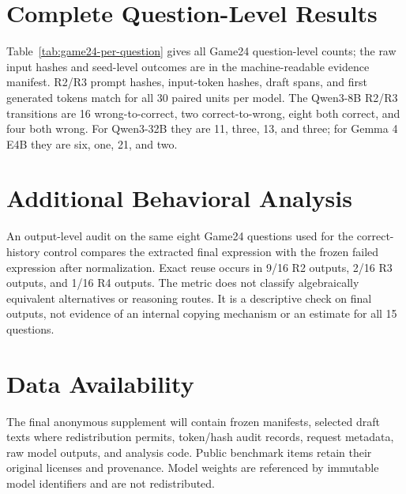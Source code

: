 \documentclass{article}
\begin{document}
\section{Complete Question-Level Results}

Table~\ref{tab:game24-per-question} gives all Game24 question-level counts; the raw input hashes and seed-level outcomes are in the machine-readable evidence manifest. R2/R3 prompt hashes, input-token hashes, draft spans, and first generated tokens match for all 30 paired units per model. The Qwen3-8B R2/R3 transitions are 16 wrong-to-correct, two correct-to-wrong, eight both correct, and four both wrong. For Qwen3-32B they are 11, three, 13, and three; for Gemma 4 E4B they are six, one, 21, and two.



\section{Additional Behavioral Analysis}

An output-level audit on the same eight Game24 questions used for the correct-history control compares the extracted final expression with the frozen failed expression after normalization. Exact reuse occurs in 9/16 R2 outputs, 2/16 R3 outputs, and 1/16 R4 outputs. The metric does not classify algebraically equivalent alternatives or reasoning routes. It is a descriptive check on final outputs, not evidence of an internal copying mechanism or an estimate for all 15 questions.

\section{Data Availability}

The final anonymous supplement will contain frozen manifests, selected draft texts where redistribution permits, token/hash audit records, request metadata, raw model outputs, and analysis code. Public benchmark items retain their original licenses and provenance. Model weights are referenced by immutable model identifiers and are not redistributed.
\end{document}
